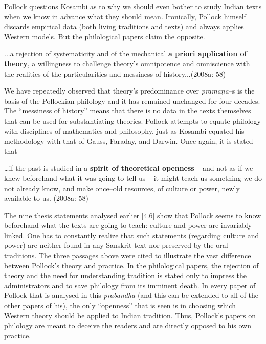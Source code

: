 Pollock questions Kosambi as to why we should even bother to study Indian texts when we know in advance what they should mean. Ironically, Pollock himself discards empirical data (both living traditions and texts) and always applies Western models. But the philological papers claim the opposite.

\begin{myquote}
...a rejection of systematicity and of the mechanical \textbf{a priori application of theory}, a willingness to challenge theory’s omnipotence and omniscience with the realities of the particularities and messiness of history...(2008a: 58)
\end{myquote}

We have repeatedly observed that theory’s predominance over \textit{pramāṇa}–s is the basis of the Pollockian philology and it has remained unchanged for four decades. The “messiness of history” means that there is no data in the texts themselves that can be used for substantiating theories. Pollock attempts to equate philology with disciplines of mathematics and philosophy, just as Kosambi equated his methodology with that of Gauss, Faraday, and Darwin. Once again, it is stated that

\begin{myquote}
…if the past is studied in a \textbf{spirit of theoretical openness} – and not as if we knew beforehand what it was going to tell us – it might teach us something we do not already know, and make once–old resources, of culture or power, newly available to us. (2008a: 58)
\end{myquote}

The nine thesis statements analysed earlier [4.6] show that Pollock seems to know beforehand what the texts are going to teach: culture and power are invariably linked. One has to constantly realize that such statements (regarding culture and power) are neither found in any Sanskrit text nor preserved by the oral traditions. The three passages above were cited to illustrate the vast difference between Pollock’s theory and practice. In the philological papers, the rejection of theory and the need for understanding tradition is stated only to impress the administrators and to save philology from its imminent death. In every paper of Pollock that is analysed in this \textit{prabandha }(and this can be extended to all of the other papers of his), the only “openness” that is seen is in choosing which Western theory should be applied to Indian tradition. Thus, Pollock’s papers on philology are meant to deceive the readers and are directly opposed to his own practice.


